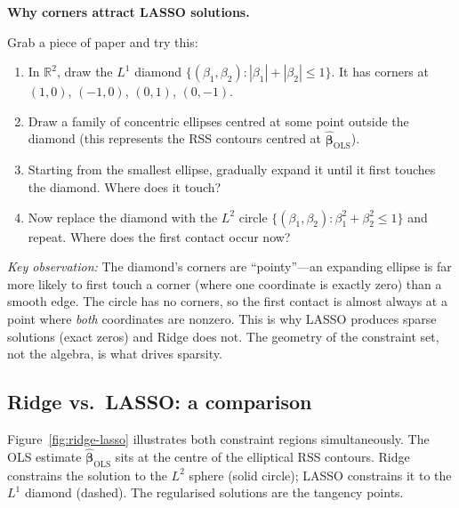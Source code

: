\documentclass[11pt,a4paper]{article}
\theoremstyle{plain}
\theoremstyle{definition}
\newcommand{\R}{\mathbb{R}}
\newcommand{\bhat}{\hat{\bm{\beta}}}
\begin{document}
\begin{stopandthink}
\textbf{Why corners attract LASSO solutions.}

Grab a piece of paper and try this:
\begin{enumerate}[nosep]
  \item In $\R^2$, draw the $L^1$ diamond
        $\{(\beta_1, \beta_2) : |\beta_1| + |\beta_2| \le 1\}$.
        It has corners at $(1,0)$, $(-1,0)$, $(0,1)$, $(0,-1)$.
  \item Draw a family of concentric ellipses centred at some point
        outside the diamond (this represents the RSS contours centred
        at $\bhat_{\text{OLS}}$).
  \item Starting from the smallest ellipse, gradually expand it until
        it first touches the diamond. Where does it touch?
  \item Now replace the diamond with the $L^2$ circle
        $\{(\beta_1, \beta_2) : \beta_1^2 + \beta_2^2 \le 1\}$
        and repeat. Where does the first contact occur now?
\end{enumerate}
\emph{Key observation:}
The diamond's corners are ``pointy''---an expanding ellipse is far more
likely to first touch a corner (where one coordinate is exactly zero)
than a smooth edge.
The circle has no corners, so the first contact is almost always at a
point where \emph{both} coordinates are nonzero.
This is why LASSO produces sparse solutions (exact zeros) and Ridge
does not.
The geometry of the constraint set, not the algebra, is what drives
sparsity.
\end{stopandthink}


\subsection{Ridge vs.\ LASSO: a comparison}

Figure~\ref{fig:ridge-lasso} illustrates both constraint regions
simultaneously.
The OLS estimate $\bhat_{\text{OLS}}$ sits at the centre of the
elliptical RSS contours.
Ridge constrains the solution to the $L^2$ sphere (solid circle);
LASSO constrains it to the $L^1$ diamond (dashed).
The regularised solutions are the tangency points.
\end{document}
